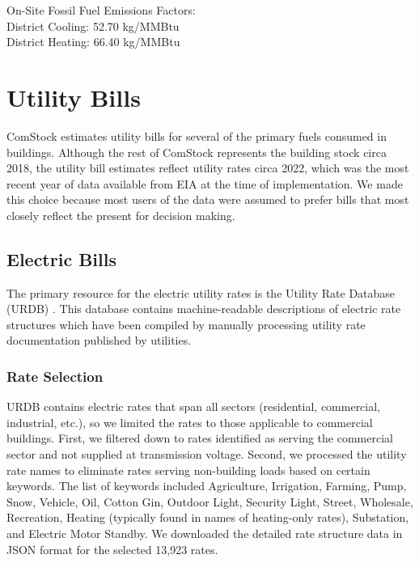 On-Site Fossil Fuel Emissions Factors:\\
District Cooling: 52.70 kg/MMBtu\\
District Heating: 66.40 kg/MMBtu\\

\section{Utility Bills}
ComStock estimates utility bills for several of the primary fuels consumed in buildings.
Although the rest of ComStock represents the building stock circa 2018, the utility bill estimates reflect utility rates
circa 2022, which was the most recent year of data available from EIA at the time of implementation. We made this choice
because most users of the data were assumed to prefer bills that most closely reflect the present for decision making.

\subsection{Electric Bills}
The primary resource for the electric utility rates is the Utility Rate Database (URDB) \citep{urdb}. This database contains machine-readable descriptions of electric rate structures which have been compiled by manually processing utility rate documentation published by utilities.

\subsubsection{Rate Selection}
URDB contains electric rates that span all sectors (residential, commercial, industrial, etc.), so we limited the rates to those applicable to commercial buildings. First, we filtered down to rates identified as serving the commercial sector and not supplied at transmission voltage. Second, we processed the utility rate names to eliminate rates serving non-building loads based on certain keywords. The list of keywords included Agriculture, Irrigation, Farming, Pump, Snow, Vehicle, Oil, Cotton Gin, Outdoor Light, Security Light, Street, Wholesale, Recreation, Heating (typically found in names of heating-only rates), Substation, and Electric Motor Standby. We downloaded the detailed rate structure data in JSON format for the selected 13,923 rates.

